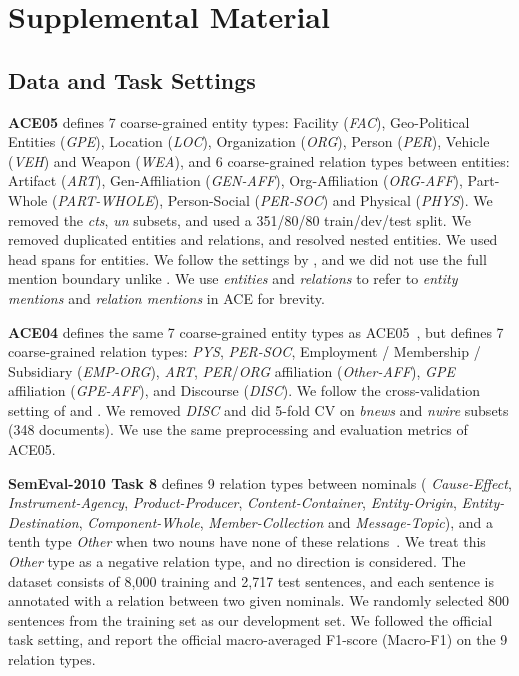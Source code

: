 \documentclass[11pt]{article}
\begin{document}
\appendix

\section{Supplemental Material}
\subsection{Data and Task Settings}

{\bf ACE05} defines 7 coarse-grained entity types: Facility ({\it FAC}), Geo-Political Entities ({\it GPE}), Location ({\it LOC}), Organization ({\it ORG}), Person ({\it PER}), Vehicle ({\it VEH}) and Weapon ({\it WEA}), and 6 coarse-grained relation types between entities: Artifact ({\it ART}), Gen-Affiliation ({\it GEN-AFF}), Org-Affiliation ({\it ORG-AFF}), Part-Whole ({\it PART-WHOLE}), Person-Social ({\it PER-SOC}) and Physical ({\it PHYS}).
We removed the {\it cts}, {\it un} subsets, and used a 351/80/80 train/dev/test split. We removed duplicated entities and relations, and resolved nested entities. We used head spans for entities. We follow the settings by \cite{li-ji:2014:P14-1}, and we did not use the full mention boundary unlike . We use {\it entities} and {\it
relations} to refer to {\it entity mentions} and {\it relation mentions} in ACE for brevity.

{\bf ACE04} defines the same 7 coarse-grained entity types as ACE05~\cite{doddington:5:2004:lrec2004}, but defines 7 coarse-grained relation types: {\it PYS}, {\it PER-SOC}, Employment / Membership / Subsidiary ({\it EMP-ORG}), {\it ART}, {\it PER}/{\it ORG} affiliation ({\it Other-AFF}), {\it GPE} affiliation ({\it GPE-AFF}), and Discourse ({\it DISC}).
We follow the cross-validation setting of  and . We removed {\it DISC} and did 5-fold CV on {\it bnews} and {\it nwire} subsets (348 documents). We use the same preprocessing and evaluation metrics of ACE05.

{\bf SemEval-2010 Task 8} defines 9 relation types between nominals ( 
{\it Cause-Effect}, {\it Instrument-Agency}, {\it Product-Producer}, 
{\it Content-Container}, {\it Entity-Origin}, {\it Entity-Destination}, 
{\it Component-Whole}, {\it Member-Collection} and {\it Message-Topic}), and a tenth type {\it Other} when two nouns have none of these relations~\cite{hendrickx-EtAl:2010:SemEval}. 
We treat this {\it Other} type as a negative relation type, and no direction is considered.
The dataset consists of 8,000 training and 2,717 test sentences, and each sentence is
annotated with a relation between two given nominals.
We randomly selected 800 sentences from the training set as our development set. We followed the official task setting, and report the official
macro-averaged F1-score (Macro-F1) on the 9 relation types. 
\end{document}
